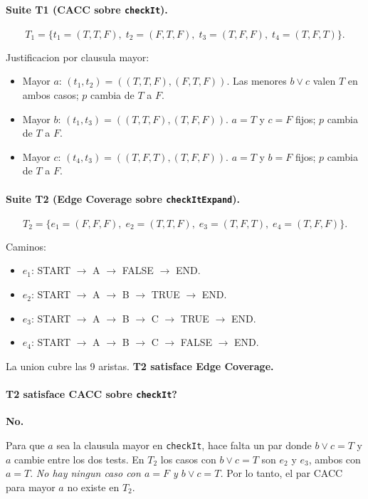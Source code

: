 \documentclass[12pt,a4paper]{article}
\begin{document}
\paragraph{Suite T1 (CACC sobre \texttt{checkIt}).}

\[
T_1 = \{ t_1=(T,T,F),\; t_2=(F,T,F),\; t_3=(T,F,F),\; t_4=(T,F,T) \}.
\]

Justificacion por clausula mayor:

\begin{itemize}
  \item Mayor $a$: $(t_1,t_2)=((T,T,F),(F,T,F))$. Las menores $b\vee c$ valen $T$ en ambos casos;
  $p$ cambia de $T$ a $F$.
  \item Mayor $b$: $(t_1,t_3)=((T,T,F),(T,F,F))$. $a=T$ y $c=F$ fijos; $p$ cambia de $T$ a $F$.
  \item Mayor $c$: $(t_4,t_3)=((T,F,T),(T,F,F))$. $a=T$ y $b=F$ fijos; $p$ cambia de $T$ a $F$.
\end{itemize}

\paragraph{Suite T2 (Edge Coverage sobre \texttt{checkItExpand}).}

\[
T_2 = \{ e_1=(F,F,F),\; e_2=(T,T,F),\; e_3=(T,F,T),\; e_4=(T,F,F) \}.
\]

Caminos:

\begin{itemize}
  \item $e_1$: START $\to$ A $\to$ FALSE $\to$ END.
  \item $e_2$: START $\to$ A $\to$ B $\to$ TRUE $\to$ END.
  \item $e_3$: START $\to$ A $\to$ B $\to$ C $\to$ TRUE $\to$ END.
  \item $e_4$: START $\to$ A $\to$ B $\to$ C $\to$ FALSE $\to$ END.
\end{itemize}

La union cubre las 9 aristas. \textbf{T2 satisface Edge Coverage.}

\paragraph{\textquestiondown{}T2 satisface CACC sobre \texttt{checkIt}?} \textbf{No.}

Para que $a$ sea la clausula mayor en \texttt{checkIt}, hace falta un par donde
$b \vee c = T$ y $a$ cambie entre los dos tests. En $T_2$ los casos con $b \vee c = T$ son $e_2$
y $e_3$, ambos con $a=T$. \emph{No hay ningun caso con $a=F$ y $b\vee c = T$.} Por lo tanto, el
par CACC para mayor $a$ no existe en $T_2$.
\end{document}
